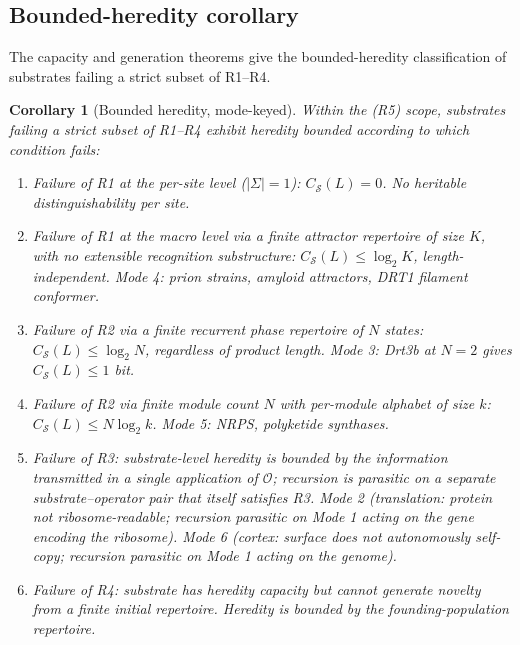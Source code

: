 \documentclass[11pt]{article}
\theoremstyle{plain}
\newtheorem{corollary}[theorem]{Corollary}
\theoremstyle{definition}
\newcommand{\Csub}{C_{\mathcal{S}}}
\newcommand{\Op}{\mathcal{O}}
\begin{document}
\subsection{Bounded-heredity corollary}
\label{subsec:bounded}

The capacity and generation theorems give the bounded-heredity classification of substrates failing a strict subset of R1--R4.

\begin{corollary}[Bounded heredity, mode-keyed]
\label{cor:supp_bounded}
Within the (R5) scope, substrates failing a strict subset of R1--R4 exhibit heredity bounded according to which condition fails:
\begin{enumerate}
\item Failure of R1 at the per-site level ($|\Sigma| = 1$): $\Csub(L) = 0$. No heritable distinguishability per site.

\item Failure of R1 at the macro level via a finite attractor repertoire of size $K$, with no extensible recognition substructure: $\Csub(L) \le \log_2 K$, length-independent. Mode 4: prion strains, amyloid attractors, DRT1 filament conformer.

\item Failure of R2 via a finite recurrent phase repertoire of $N$ states: $\Csub(L) \le \log_2 N$, regardless of product length. Mode 3: Drt3b at $N = 2$ gives $\Csub(L) \le 1$ bit.

\item Failure of R2 via finite module count $N$ with per-module alphabet of size $k$: $\Csub(L) \le N \log_2 k$. Mode 5: NRPS, polyketide synthases.

\item Failure of R3: substrate-level heredity is bounded by the information transmitted in a single application of $\Op$; recursion is parasitic on a separate substrate--operator pair that itself satisfies R3. Mode 2 (translation: protein not ribosome-readable; recursion parasitic on Mode 1 acting on the gene encoding the ribosome). Mode 6 (cortex: surface does not autonomously self-copy; recursion parasitic on Mode 1 acting on the genome).

\item Failure of R4: substrate has heredity capacity but cannot generate novelty from a finite initial repertoire. Heredity is bounded by the founding-population repertoire.
\end{enumerate}
\end{corollary}
\end{document}

